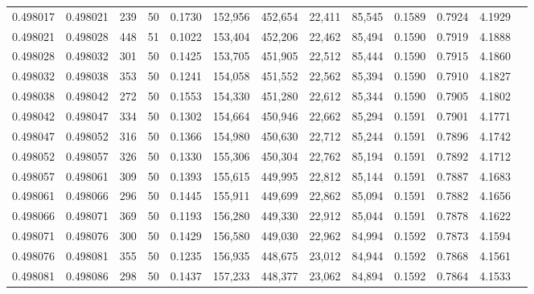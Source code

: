 \begin{tabular}{rrrrrrrrrrrrr}
0.498017 & 0.498021 & 239 &  50 &                                     0.1730 & 152,956 & 452,654 &  22,411 &  85,545 & 0.1589 & 0.7924 & 4.1929 \\
0.498021 & 0.498028 & 448 &  51 &                                     0.1022 & 153,404 & 452,206 &  22,462 &  85,494 & 0.1590 & 0.7919 & 4.1888 \\
0.498028 & 0.498032 & 301 &  50 &                                     0.1425 & 153,705 & 451,905 &  22,512 &  85,444 & 0.1590 & 0.7915 & 4.1860 \\
0.498032 & 0.498038 & 353 &  50 &                                     0.1241 & 154,058 & 451,552 &  22,562 &  85,394 & 0.1590 & 0.7910 & 4.1827 \\
0.498038 & 0.498042 & 272 &  50 &                                     0.1553 & 154,330 & 451,280 &  22,612 &  85,344 & 0.1590 & 0.7905 & 4.1802 \\
0.498042 & 0.498047 & 334 &  50 &                                     0.1302 & 154,664 & 450,946 &  22,662 &  85,294 & 0.1591 & 0.7901 & 4.1771 \\
0.498047 & 0.498052 & 316 &  50 &                                     0.1366 & 154,980 & 450,630 &  22,712 &  85,244 & 0.1591 & 0.7896 & 4.1742 \\
0.498052 & 0.498057 & 326 &  50 &                                     0.1330 & 155,306 & 450,304 &  22,762 &  85,194 & 0.1591 & 0.7892 & 4.1712 \\
0.498057 & 0.498061 & 309 &  50 &                                     0.1393 & 155,615 & 449,995 &  22,812 &  85,144 & 0.1591 & 0.7887 & 4.1683 \\
0.498061 & 0.498066 & 296 &  50 &                                     0.1445 & 155,911 & 449,699 &  22,862 &  85,094 & 0.1591 & 0.7882 & 4.1656 \\
0.498066 & 0.498071 & 369 &  50 &                                     0.1193 & 156,280 & 449,330 &  22,912 &  85,044 & 0.1591 & 0.7878 & 4.1622 \\
0.498071 & 0.498076 & 300 &  50 &                                     0.1429 & 156,580 & 449,030 &  22,962 &  84,994 & 0.1592 & 0.7873 & 4.1594 \\
0.498076 & 0.498081 & 355 &  50 &                                     0.1235 & 156,935 & 448,675 &  23,012 &  84,944 & 0.1592 & 0.7868 & 4.1561 \\
0.498081 & 0.498086 & 298 &  50 &                                     0.1437 & 157,233 & 448,377 &  23,062 &  84,894 & 0.1592 & 0.7864 & 4.1533 \\

\end{tabular}
